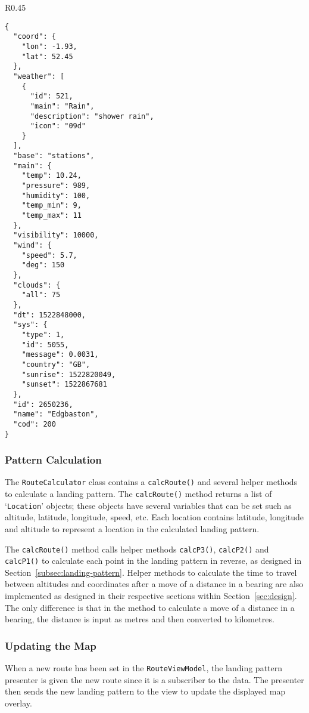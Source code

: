 \begin{wrapfigure}{R}{0.45\textwidth}
  \begin{verbatim}
{
  "coord": {
    "lon": -1.93,
    "lat": 52.45
  },
  "weather": [
    {
      "id": 521,
      "main": "Rain",
      "description": "shower rain",
      "icon": "09d"
    }
  ],
  "base": "stations",
  "main": {
    "temp": 10.24,
    "pressure": 989,
    "humidity": 100,
    "temp_min": 9,
    "temp_max": 11
  },
  "visibility": 10000,
  "wind": {
    "speed": 5.7,
    "deg": 150
  },
  "clouds": {
    "all": 75
  },
  "dt": 1522848000,
  "sys": {
    "type": 1,
    "id": 5055,
    "message": 0.0031,
    "country": "GB",
    "sunrise": 1522820049,
    "sunset": 1522867681
  },
  "id": 2650236,
  "name": "Edgbaston",
  "cod": 200
}
  \end{verbatim}
  \label{lst:json-response}
\end{wrapfigure}

\subsubsection{Pattern Calculation}\label{subsubsec:pattern-calculation}
The \texttt{RouteCalculator} class contains a \texttt{calcRoute()} and several helper methods to calculate a landing pattern. The \texttt{calcRoute()} method returns a list of `\texttt{Location}' objects; these objects have several variables that can be set such as altitude, latitude, longitude, speed, etc. Each location contains latitude, longitude and altitude to represent a location in the calculated landing pattern.

The \texttt{calcRoute()} method calls helper methods \texttt{calcP3()}, \texttt{calcP2()} and \texttt{calcP1()} to calculate each point in the landing pattern in reverse, as designed in Section~\ref{subsec:landing-pattern}. Helper methods to calculate the time to travel between altitudes and coordinates after a move of a distance in a bearing are also implemented as designed in their respective sections within Section~\ref{sec:design}. The only difference is that in the method to calculate a move of a distance in a bearing, the distance is input as metres and then converted to kilometres.

\subsubsection{Updating the Map}
When a new route has been set in the \texttt{RouteViewModel}, the landing pattern presenter is given the new route since it is a subscriber to the data. The presenter then sends the new landing pattern to the view to update the displayed map overlay.

